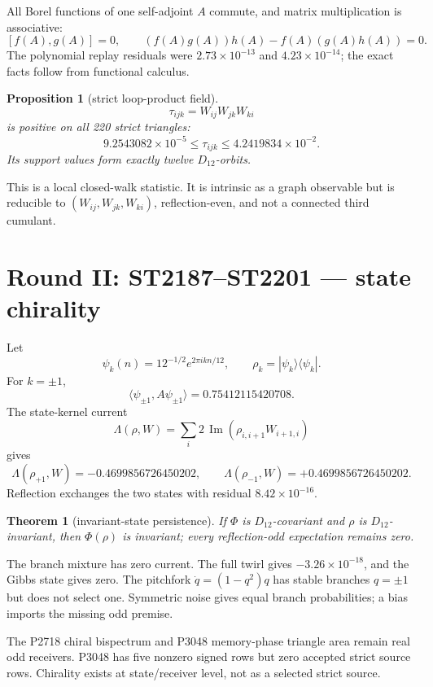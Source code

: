 \documentclass[11pt,a4paper]{article}
\newtheorem{theorem}{Theorem}
\newtheorem{proposition}{Proposition}
\begin{document}
All Borel functions of one self-adjoint \(A\) commute, and matrix multiplication
is associative:
\[
 [f(A),g(A)]=0,\qquad
 (f(A)g(A))h(A)-f(A)(g(A)h(A))=0.
\]
The polynomial replay residuals were \(2.73\times10^{-13}\) and
\(4.23\times10^{-14}\); the exact facts follow from functional calculus.

\begin{proposition}[strict loop-product field]
\[
 \tau_{ijk}=W_{ij}W_{jk}W_{ki}
\]
is positive on all 220 strict triangles:
\[
 9.2543082\times10^{-5}\leq\tau_{ijk}
 \leq4.2419834\times10^{-2}.
\]
Its support values form exactly twelve \(D_{12}\)-orbits.
\end{proposition}

This is a local closed-walk statistic.  It is intrinsic as a graph observable
but is reducible to \((W_{ij},W_{jk},W_{ki})\), reflection-even, and not a
connected third cumulant.

\section{Round II: ST2187--ST2201 --- state chirality}

Let
\[
 \psi_k(n)=12^{-1/2}e^{2\pi i kn/12},\qquad
 \rho_k=|\psi_k\rangle\langle\psi_k|.
\]
For \(k=\pm1\),
\[
 \langle\psi_{\pm1},A\psi_{\pm1}\rangle=0.75412115420708.
\]
The state-kernel current
\[
 \Lambda(\rho,W)
 =\sum_i2\,\operatorname{Im}(\rho_{i,i+1}W_{i+1,i})
\]
gives
\[
 \Lambda(\rho_{+1},W)=-0.4699856726450202,\qquad
 \Lambda(\rho_{-1},W)=+0.4699856726450202.
\]
Reflection exchanges the two states with residual \(8.42\times10^{-16}\).

\begin{theorem}[invariant-state persistence]
If \(\Phi\) is \(D_{12}\)-covariant and \(\rho\) is \(D_{12}\)-invariant, then
\(\Phi(\rho)\) is invariant; every reflection-odd expectation remains zero.
\end{theorem}

The branch mixture has zero current.  The full twirl gives
\(-3.26\times10^{-18}\), and the Gibbs state gives zero.  The pitchfork
\(\dot q=(1-q^2)q\) has stable branches \(q=\pm1\) but does not select one.
Symmetric noise gives equal branch probabilities; a bias imports the missing
odd premise.

The P2718 chiral bispectrum and P3048 memory-phase triangle area remain real
odd receivers.  P3048 has five nonzero signed rows but zero accepted strict
source rows.  Chirality exists at state/receiver level, not as a selected
strict source.
\end{document}

